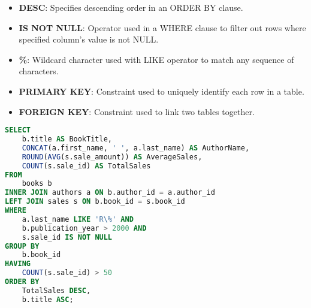 \begin{itemize}[noitemsep,leftmargin=*]
    \item[]{\textbf{DESC}: Specifies descending order in an ORDER BY clause.}
    \item[]{\textbf{IS NOT NULL}: Operator used in a WHERE clause to filter out rows where specified column's value is not NULL.}
    \item[]{\textbf{\%}: Wildcard character used with LIKE operator to match any sequence of characters.}
    \item[]{\textbf{PRIMARY KEY}: Constraint used to uniquely identify each row in a table.}
    \item[]{\textbf{FOREIGN KEY}: Constraint used to link two tables together.}
\end{itemize}

\begin{lstlisting}[language=SQL]
SELECT
    b.title AS BookTitle,
    CONCAT(a.first_name, ' ', a.last_name) AS AuthorName,
    ROUND(AVG(s.sale_amount)) AS AverageSales,
    COUNT(s.sale_id) AS TotalSales
FROM
    books b
INNER JOIN authors a ON b.author_id = a.author_id
LEFT JOIN sales s ON b.book_id = s.book_id
WHERE
    a.last_name LIKE 'R\%' AND
    b.publication_year > 2000 AND
    s.sale_id IS NOT NULL
GROUP BY
    b.book_id
HAVING
    COUNT(s.sale_id) > 50
ORDER BY
    TotalSales DESC,
    b.title ASC;
\end{lstlisting}

